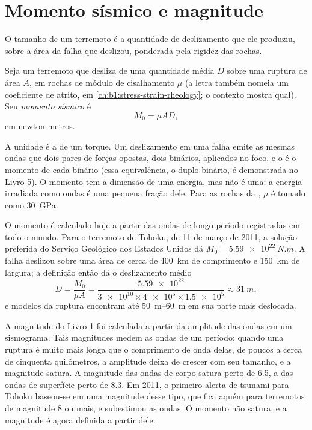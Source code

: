 \section{Momento sísmico e magnitude}\label{sec:b1:earthquake-source:moment}

O tamanho de um terremoto é a quantidade de deslizamento que ele produziu, sobre a área da falha que deslizou, ponderada pela rigidez das rochas.

\begin{definition}\label{def:b1:earthquake-source:moment}
Seja um terremoto que desliza de uma quantidade média $D$ sobre uma ruptura de área $A$, em rochas de módulo de cisalhamento $\mu$ (a letra também nomeia um coeficiente de atrito, em \cref{ch:b1:stress-strain-rheology}; o contexto mostra qual). Seu \emph{momento sísmico} é
\[
  M_0 = \mu A D ,
\]
em newton metros.
\end{definition}

A unidade é a de um torque. Um deslizamento em uma falha emite as mesmas ondas que dois pares de forças opostas, dois binários, aplicados no foco, e o  é o momento de cada binário (essa equivalência, o duplo binário, é demonstrada no Livro 5). O momento tem a dimensão de uma energia, mas não é uma: a energia irradiada como ondas é uma pequena fração dele. Para as rochas da , $\mu$ é tomado como \qty{30}{GPa}.

O momento é calculado hoje a partir das ondas de longo período registradas em todo o mundo. Para o terremoto de Tohoku, de 11 de março de 2011, a solução preferida do Serviço Geológico dos Estados Unidos dá $M_0 = \qty{5.59e22}{N.m}$. A falha deslizou sobre uma área de cerca de \qty{400}{km} de comprimento e \qty{150}{km} de largura; a definição então dá o deslizamento médio
\[
  D = \frac{M_0}{\mu A}
    = \frac{\num{5.59e22}}{\num{3e10}\times\num{4e5}\times\num{1.5e5}}
    \approx \qty{31}{m} ,
\]
e modelos da ruptura encontram até \qtyrange{50}{60}{m} em sua parte mais deslocada.

A magnitude do Livro 1 foi calculada a partir da amplitude das ondas em um sismograma. Tais magnitudes medem as ondas de um período; quando uma ruptura é muito mais longa que o comprimento de onda delas, de poucos a cerca de cinquenta quilômetros, a amplitude deixa de crescer com seu tamanho, e a magnitude satura. A magnitude das ondas de corpo satura perto de 6.5, a das ondas de superfície perto de 8.3. Em 2011, o primeiro alerta de tsunami para Tohoku baseou-se em uma magnitude desse tipo, que fica aquém para terremotos de magnitude 8 ou mais, e subestimou as ondas. O momento não satura, e a magnitude é agora definida a partir dele.


